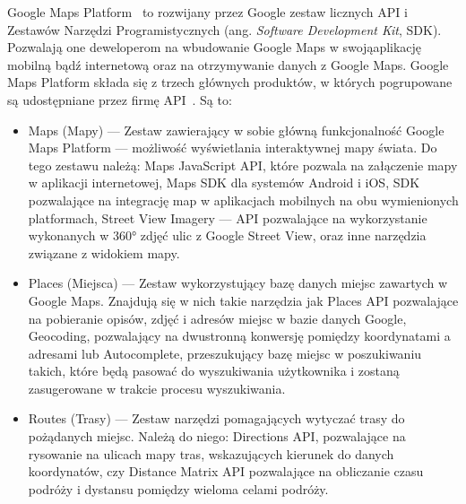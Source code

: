         Google Maps Platform~\cite{MAPS} to rozwijany przez Google zestaw licznych API i Zestawów Narzędzi Programistycznych (ang. \emph{Software Development Kit}, SDK). Pozwalają one deweloperom na 
        wbudowanie Google Maps w swoją\@ aplikację mobilną bądź internetową oraz na otrzymywanie danych z Google Maps. Google Maps Platform składa się z trzech głównych produktów, w których pogrupowane
        są udostępniane przez firmę API~\cite{MAPS_API}. Są to: 
        \begin{itemize}    	
        \item  Maps (Mapy) — Zestaw zawierający w sobie główną funkcjonalność Google Maps Platform — możliwość wyświetlania interaktywnej mapy świata. Do tego zestawu należą: Maps JavaScript API,
        które pozwala na załączenie mapy w aplikacji internetowej, Maps SDK dla systemów Android i iOS, SDK pozwalające na integrację map w aplikacjach mobilnych na obu wymienionych platformach,
        Street View Imagery — API pozwalające na wykorzystanie wykonanych w 360° zdjęć ulic z Google Street View, oraz inne narzędzia związane z widokiem mapy. 
        
        \item  Places (Miejsca) — Zestaw wykorzystujący bazę danych miejsc zawartych w Google Maps. Znajdują się w nich takie narzędzia jak Places API pozwalające na pobieranie
        opisów, zdjęć i adresów miejsc w bazie danych Google, Geocoding, pozwalający na dwustronną konwersję pomiędzy koordynatami a adresami lub Autocomplete, przeszukujący bazę miejsc w poszukiwaniu
        takich, które będą pasować do wyszukiwania użytkownika i zostaną zasugerowane w trakcie procesu wyszukiwania. 

        \item  Routes (Trasy) — Zestaw narzędzi pomagających wytyczać trasy do pożądanych miejsc. Należą do niego: Directions API, pozwalające na rysowanie na ulicach mapy tras, wskazujących kierunek
        do danych koordynatów, czy Distance Matrix API pozwalające na obliczanie czasu podróży i dystansu pomiędzy wieloma celami podróży.

        \end{itemize}
